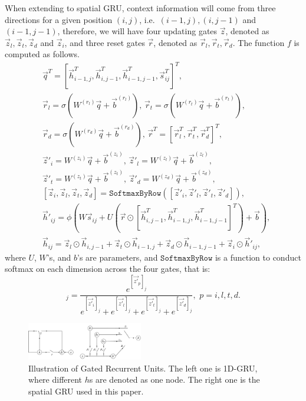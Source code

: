 When extending to spatial GRU, context information will come from three directions for a given position $(i,j)$, i.e.~$(i{-}1,j),(i,j{-}1)$ and $(i{-}1,j{-}1)$, therefore, we will have four updating gates $\vec{z}$, denoted as $\vec{z}_{l},\vec{z}_t, \vec{z}_d$ and $\vec{z}_i$, and three reset gates $\vec{r}$, denoted as $\vec{r}_l, \vec{r}_t, \vec{r}_d$. The function $f$ is computed as follows.
	\begin{align}\label{eq:SRNN}
&\vec{q}^T=[\vec{h}_{i-1,j}^T,\vec{h}_{i,j-1}^T,\vec{h}_{i-1,j-1}^T,\vec{s}_{ij}^T]^T,\nonumber\\
		&\vec{r}_l =\sigma(W^{(r_l)}\vec{q}+\vec{b}^{(r_l)}),\,\vec{r}_t =\sigma(W^{(r_t)}\vec{q}+\vec{b}^{(r_t)}),\nonumber\\
		&\vec{r}_d =\sigma(W^{(r_d)}\vec{q}+\vec{b}^{(r_d)}),\,\vec{r}^T  =[\vec{r}_l^T,\vec{r}_t^T,\vec{r}_d^T]^T,\nonumber\\
		&\vec{z}'_{i} = W^{(z_i)}\vec{q}+\vec{b}^{(z_i)},\,\vec{z}'_{l} =W^{(z_l)}\vec{q}+\vec{b}^{(z_l)},\nonumber\\
 		&\vec{z}'_{t} =W^{(z_t)}\vec{q}+\vec{b}^{(z_t)},\,\vec{z}'_{d}=W^{(z_d)}\vec{q}+\vec{b}^{(z_d)},\nonumber\\
 		&[\vec{z}_i, \vec{z}_l, \vec{z}_t, \vec{z}_{d}] = \texttt{SoftmaxByRow}([\vec{z}'_i, \vec{z}'_l, \vec{z}'_t, \vec{z}'_{d}]),\\
 		&\vec{h}'_{ij} {=}\phi(W\vec{s}_{ij} + U(\vec{r}\odot[\vec{h}_{i,j-1}^T, \vec{h}_{i-1,j}^T, \vec{h}_{i-1,j-1}^T]^T) + \vec{b}), \nonumber\\
 		&\vec{h}_{ij}     {=}\vec{z}_{l}\odot\vec{h}_{i,j-1}{+}\vec{z}_{t}\odot\vec{h}_{i-1,j}{+}
            		  \vec{z}_{d}\odot\vec{h}_{i-1,j-1}{+}\vec{z}_{i}\odot\vec{h}'_{ij},
	\end{align}
where $U$, $W$'s, and $b$'s are parameters, and $\texttt{SoftmaxByRow}$ is a function to conduct softmax on each dimension across the four gates, that is:
\begin{equation*}
[\vec{z}_p]_j=\frac{e^{[\vec{z'}_p]_j}}{e^{[\vec{z'}_i]_j}+ e^{[\vec{z'}_l]_j}+ e^{[\vec{z'}_t]_j}+ e^{[\vec{z'}_{d}]_j}}, \,\, p=i,l,t,d.
\end{equation*}
\begin{figure}[t]
\centering
\includegraphics[width=0.45\textwidth]{figures/g.png}
\caption{Illustration of Gated Recurrent Units. The left one is 1D-GRU, where different $h$s are denoted as one node. The right one is the spatial GRU used in this paper. }
\label{fig:GRU}
\end{figure}


